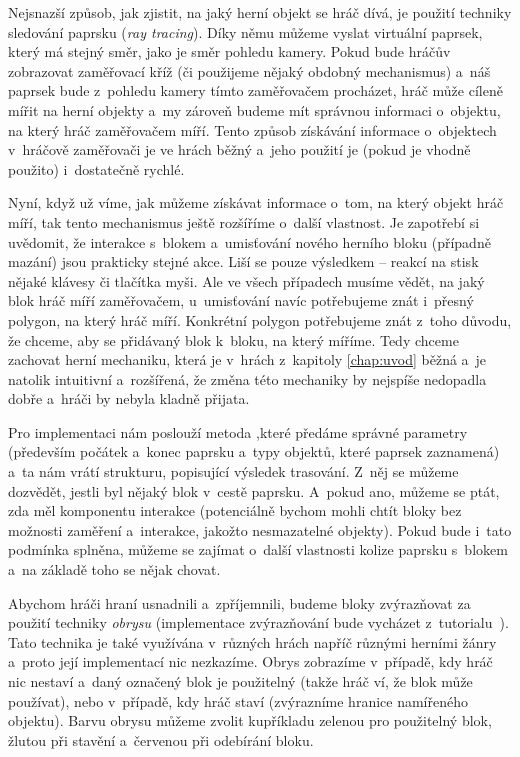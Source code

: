 Nejsnazší způsob, jak zjistit, na jaký herní objekt se hráč dívá, je použití techniky sledování paprsku (\textit{ray tracing}). Díky němu můžeme  vyslat virtuální paprsek, který má stejný směr, jako je směr pohledu kamery. Pokud bude hráčův \HUD{} zobrazovat zaměřovací kříž (či použijeme nějaký obdobný mechanismus) a~náš paprsek bude z~pohledu kamery tímto zaměřovačem procházet, hráč může cíleně mířit na herní objekty a~my zároveň budeme mít správnou informaci o~objektu, na který hráč zaměřovačem míří. Tento způsob získávání informace o~objektech v~hráčově zaměřovači je ve hrách běžný a~jeho použití je (pokud je vhodně použito) i~dostatečně rychlé.

Nyní, když už víme, jak můžeme získávat informace o~tom, na který objekt hráč míří, tak tento mechanismus ještě rozšíříme o~další vlastnost. Je zapotřebí si uvědomit, že interakce s~blokem a~umisťování nového herního bloku (případně mazání) jsou prakticky stejné akce. Liší se pouze výsledkem -- reakcí na stisk nějaké klávesy či tlačítka myši. Ale ve všech případech musíme vědět, na jaký blok hráč míří zaměřovačem, u~umisťování navíc potřebujeme znát i~přesný polygon, na který hráč míří. Konkrétní polygon potřebujeme znát z~toho důvodu, že chceme, aby se přidávaný blok  k~bloku, na který míříme. Tedy chceme zachovat herní mechaniku, která je v~hrách z~kapitoly \ref{chap:uvod} běžná a~je natolik intuitivní a~rozšířená, že změna této mechaniky by nejspíše nedopadla dobře a~hráči by nebyla kladně přijata.

Pro implementaci nám poslouží metoda ,\linebreak které předáme správné parametry (především počátek a~konec paprsku a~typy objektů, které paprsek zaznamená) a~ta nám vrátí strukturu, popisující výsledek trasování. Z~něj se můžeme dozvědět, jestli byl nějaký blok v~cestě paprsku. A~pokud ano, můžeme se ptát, zda měl komponentu interakce (potenciálně bychom mohli chtít bloky bez možnosti zaměření a~interakce, jakožto nesmazatelné objekty). Pokud bude i~tato podmínka splněna, můžeme se zajímat o~další vlastnosti kolize paprsku s~blokem a~na základě toho se nějak chovat.

Abychom hráči hraní usnadnili a~zpříjemnili, budeme bloky zvýrazňovat za použití techniky \textit{obrysu} (implementace zvýrazňování bude vycházet z~tutorialu~\citep{ue_outline_tut}). Tato technika je také využívána v~různých hrách napříč různými herními žánry a~proto její implementací nic nezkazíme. Obrys zobrazíme v~případě, kdy hráč nic nestaví a~daný označený blok je použitelný (takže hráč ví, že blok může používat), nebo v~případě, kdy hráč staví (zvýrazníme hranice namířeného objektu). Barvu obrysu můžeme zvolit kupříkladu zelenou pro použitelný blok, žlutou při stavění a~červenou při odebírání bloku. 


